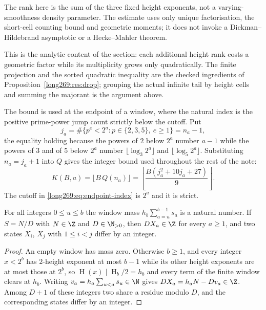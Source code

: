 \documentclass[11pt]{article}
\newcommand{\hgt}{\operatorname{H}}
\begin{document}
The rank here is the sum of the three fixed height exponents, not a
varying-smoothness density parameter. The estimate uses only unique
factorisation, the short-cell counting bound and geometric moments; it does
not invoke a Dickman--Hildebrand asymptotic or a Hecke--Mahler theorem.

This is the analytic content of the section: each additional height rank costs
a geometric factor while its multiplicity grows only quadratically.  The finite
projection and the sorted quadratic inequality are the checked ingredients of
Proposition~\ref{long269:res:drop}; grouping the actual infinite tail by height cells
and summing the majorant is the argument above.

The bound is used at the endpoint of a window, where the natural index is the
positive prime-power jump count strictly below the cutoff.  Put
\begin{equation}\label{long269:eq:endpoint-index}
 j_a=\#\{p^{e}<2^{a}:p\in\{2,3,5\},\ e\ge1\}=n_a-1 ,
\end{equation}
the equality holding because the powers of $2$ below $2^{a}$ number $a-1$ while
the powers of $3$ and of $5$ below $2^{a}$ number $\lfloor\log_3 2^{a}\rfloor$
and $\lfloor\log_5 2^{a}\rfloor$.  Substituting $n_a=j_a+1$ into $Q$ gives the
integer bound used throughout the rest of the note:
\begin{equation}\label{long269:eq:actual-bound}
 K(B,a)=\bigl\lfloor B\,Q(n_a)\bigr\rfloor
 =\left\lfloor\frac{B(j_a^{2}+10j_a+27)}9\right\rfloor .
\end{equation}
The cutoff in \eqref{long269:eq:endpoint-index} is $2^{a}$ and it is strict.

\begin{lemma}\label{long269:res:all-scale-lattice}
For all integers $0\le u\le b$ the window mass $h_b\sum_{a=u}^{b-1}s_a$ is a
natural number.  If $S=N/D$ with $N\in\Z$ and $D\in\N_{>0}$, then $DX_a\in\Z$
for every $a\ge1$, and two states $X_i$, $X_j$ with $1\le i<j$ differ by an
integer.
\end{lemma}

\begin{proof}
An empty window has mass zero.  Otherwise $b\ge1$, and every integer $x<2^{b}$
has $2$-height exponent at most $b-1$ while its other height exponents are at
most those at $2^{b}$, so $\hgt(x)\mid\hgt_b/2=h_b$ and every term of the
finite window clears at $h_b$.  Writing $v_a=h_a\sum_{u<a}s_u\in\N$ gives
$DX_a=h_aN-Dv_a\in\Z$.  Among $D+1$ of these integers two share a residue
modulo $D$, and the corresponding states differ by an integer.
\end{proof}
\end{document}

